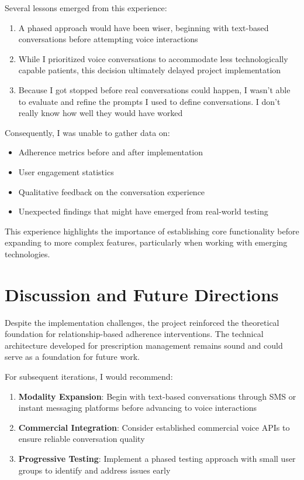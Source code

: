 \documentclass[sigconf]{acmart}
\begin{document}
Several lessons emerged from this experience:

\begin{enumerate}
\item A phased approach would have been wiser, beginning with text-based conversations before attempting voice interactions
\item While I prioritized voice conversations to accommodate less technologically capable patients, this decision ultimately delayed project implementation
\item Because I got stopped before real conversations could happen, I wasn't able to evaluate and refine the prompts I used to define conversations. I don't really know how well they would have worked
\end{enumerate}

Consequently, I was unable to gather data on:

\begin{itemize}
\item Adherence metrics before and after implementation
\item User engagement statistics
\item Qualitative feedback on the conversation experience
\item Unexpected findings that might have emerged from real-world testing
\end{itemize}

This experience highlights the importance of establishing core functionality before expanding to more complex features, particularly when working with emerging technologies.

\section{Discussion and Future Directions }
Despite the implementation challenges, the project reinforced the theoretical foundation for relationship-based adherence interventions. The technical architecture developed for prescription management remains sound and could serve as a foundation for future work.

For subsequent iterations, I would recommend:

\begin{enumerate}

\item \textbf{Modality Expansion}: Begin with text-based conversations through SMS or instant messaging platforms before advancing to voice interactions
\item \textbf{Commercial Integration}: Consider established commercial voice APIs to ensure reliable conversation quality
\item \textbf{Progressive Testing}: Implement a phased testing approach with small user groups to identify and address issues early
\end{enumerate}
  
\end{document}
